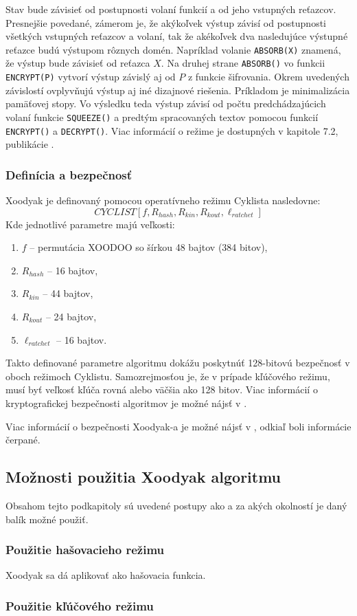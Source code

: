 Stav bude závisieť od postupnosti volaní funkcií a od jeho vstupných reťazcov. Presnejšie povedané, zámerom je, že akýkoľvek výstup závisí od postupnosti všetkých vstupných reťazcov a volaní, tak že akékoľvek dva nasledujúce výstupné reťazce budú výstupom rôznych domén. Napríklad volanie \lstinline|ABSORB(X)| znamená, že výstup bude závisieť od reťazca $X$. Na druhej strane \lstinline|ABSORB()| vo funkcii \lstinline|ENCRYPT(P)| vytvorí výstup závislý aj od $P$ z funkcie šifrovania. Okrem uvedených závislostí ovplyvňujú výstup aj iné dizajnové riešenia. Príkladom je minimalizácia pamäťovej stopy. Vo výsledku teda výstup závisí od počtu predchádzajúcich volaní funkcie \lstinline|SQUEEZE()| a predtým spracovaných textov pomocou funkcií \lstinline|ENCRYPT()| a \lstinline|DECRYPT()|. Viac informácií o režime je dostupných v kapitole 7.2, publikácie \cite{xcb}. 

\subsubsection{Definícia a bezpečnosť}
Xoodyak je definovaný pomocou operatívneho režimu Cyklista nasledovne:
\begin{equation}
	CYCLIST[f,R_{hash},R_{kin},R_{kout},\ell_{ratchet}]
\end{equation} 
Kde jednotlivé parametre majú veľkosti:
\begin{enumerate}
	\item $f$ -- permutácia XOODOO so šírkou 48 bajtov (384 bitov),
	\item $R_{hash}$ -- 16 bajtov,
	\item $R_{kin}$ -- 44 bajtov,
	\item $R_{kout}$ -- 24 bajtov,
	\item $\ell_{ratchet}$ -- 16 bajtov.  
\end{enumerate}
Takto definované parametre algoritmu dokážu poskytnúť 128-bitovú bezpečnosť v oboch režimoch Cyklistu. Samozrejmosťou je, že v prípade kľúčového režimu, musí byť veľkosť kľúča rovná alebo väčšia ako 128 bitov. Viac informácií o kryptografickej bezpečnosti algoritmov je možné nájsť v \cite{sec}.

Viac informácií o bezpečnosti Xoodyak-a je možné nájsť v \cite{xcb, 7.3}, odkiaľ boli informácie čerpané.

\subsection{Možnosti použitia Xoodyak algoritmu}
Obsahom tejto podkapitoly sú uvedené postupy ako a za akých okolností je daný balík možné použiť. 
\subsubsection{Použitie hašovacieho režimu}
Xoodyak sa dá aplikovať ako hašovacia funkcia.
\subsubsection{Použitie kľúčového režimu}
